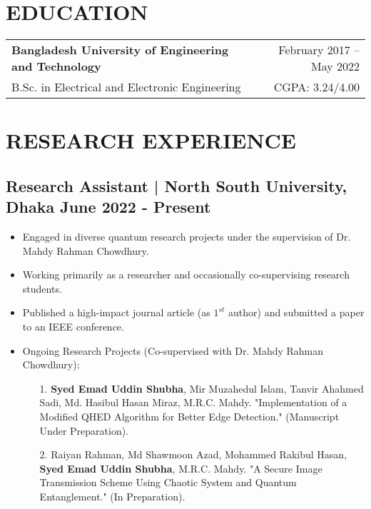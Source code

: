 \documentclass[letterpaper,11pt]{article}
\begin{document}
\section{\textbf{EDUCATION }}
\begin{tabular*}{\textwidth}{@{}l@{\extracolsep{\fill}}r@{}}
  \textbf{Bangladesh University of Engineering and Technology} & February 2017 – May 2022 \\
  B.Sc. in Electrical and Electronic Engineering  & CGPA: 3.24/4.00 \\
\end{tabular*}





\section*{\textbf{RESEARCH EXPERIENCE}}
\subsection*{Research Assistant | North South University, Dhaka \hfill June 2022 - Present}

\begin{itemize}[left=0cm]
    \setlength\itemsep{-0.025em} %
    \setlength\parskip{-0.025em} %
    \fontsize{9.6}{11.2}\selectfont
    \item Engaged in diverse quantum research projects under the supervision of Dr. Mahdy Rahman Chowdhury.
  \item Working primarily as a researcher and occasionally co-supervising research students.
  \item Published a high-impact journal article (as $1^{st}$ author) and submitted a paper to an IEEE conference.
    \item Ongoing Research Projects (Co-supervised with Dr. Mahdy Rahman Chowdhury):
    \begin{itemize}[left=0cm]
    \setlength\itemsep{-0.075em} %
    \setlength\parskip{-0.075em} %
        \item [1.] \textbf{Syed Emad Uddin Shubha}, Mir Muzahedul Islam, Tanvir Ahahmed Sadi, Md. Hasibul Hasan Miraz, M.R.C. Mahdy. "Implementation of a Modified QHED Algorithm for Better Edge Detection." (Manuscript Under Preparation).
       
        \item [2.] Raiyan Rahman, Md Shawmoon Azad, Mohammed Rakibul Hasan, \textbf{Syed Emad Uddin Shubha}, M.R.C. Mahdy. "A Secure Image Transmission Scheme Using Chaotic System and Quantum Entanglement." (In Preparation).
    \end{itemize}
\end{itemize}
\end{document}
